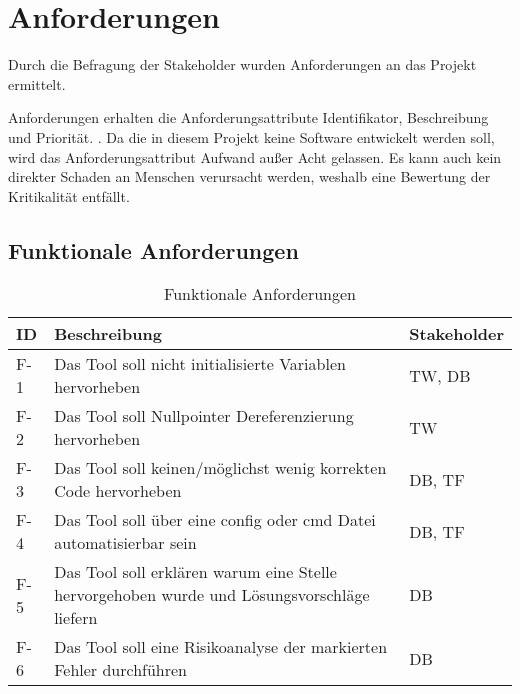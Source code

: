 \section{Anforderungen}
\label{sec:anforderungen}

Durch die Befragung der Stakeholder wurden Anforderungen an das Projekt ermittelt.

Anforderungen erhalten die Anforderungsattribute Identifikator, Beschreibung und Priorität.
\cite[S.~479~f.]{Balzert:Lehrbuch-der-softwaretechnik}. Da die in diesem Projekt keine Software entwickelt werden soll, wird das Anforderungsattribut \glqq{}Aufwand\grqq{} außer
Acht gelassen. Es kann auch kein direkter Schaden an Menschen verursacht werden, weshalb eine Bewertung der \glqq{}Kritikalität\grqq{} entfällt.

\subsection{Funktionale Anforderungen}
\label{subsec:funktional}

\begin{table}[H]
    {
        \begin{tabularx}{\linewidth}{|p{1cm}|X|p{2cm}|}
            \hline
            ID
             & Beschreibung
             & Stakeholder
            \\
            \hline
            \cline{1-3}
            F-1
             & Das Tool soll nicht initialisierte Variablen hervorheben
             & TW, DB
            \\
            \cline{1-3}
            F-2
             & Das Tool soll Nullpointer Dereferenzierung hervorheben
             & TW
            \\
            \cline{1-3}
            F-3
             & Das Tool soll keinen/möglichst wenig korrekten Code hervorheben
             & DB, TF
            \\
            \cline{1-3}
            F-4
             & Das Tool soll über eine config oder cmd Datei automatisierbar sein
             & DB, TF
            \\
            \cline{1-3}
            F-5
             & Das Tool soll erklären warum eine Stelle hervorgehoben wurde und Lösungsvorschläge liefern
             & DB
            \\
            \cline{1-3}
            F-6
             & Das Tool soll eine Risikoanalyse der markierten Fehler durchführen
             & DB
            \\
            \hline
        \end{tabularx}
    }
    \caption{Funktionale Anforderungen}
    \label{tab:funktional}
\end{table}

